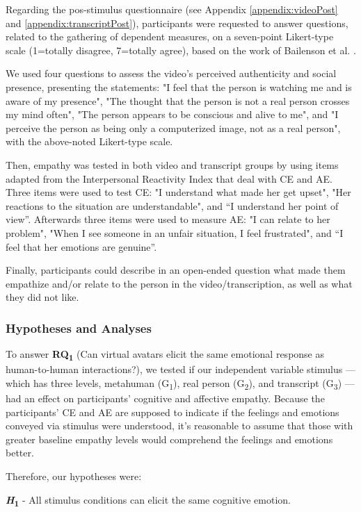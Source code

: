 Regarding the pos-stimulus questionnaire (see Appendix \ref{appendix:videoPost} and \ref{appendix:transcriptPost}), participants were requested to answer questions, related to the gathering of dependent measures, on a seven-point Likert-type scale (1=totally disagree, 7=totally agree), based on the work of Bailenson et al. \cite{BAI03}.

We used four questions to assess the video's perceived authenticity and social presence, presenting the statements: "I feel that the person is watching me and is aware of my presence", "The thought that the person is not a real person crosses my mind often", "The person appears to be conscious and alive to me", and "I perceive the person as being only a computerized image, not as a real person", with the above-noted Likert-type scale.

Then, empathy was tested in both video and transcript groups by using items adapted from the Interpersonal Reactivity Index \cite{DAV83} that deal with  CE and AE. Three items were used to test CE: "I understand what made her get upset", "Her reactions to the situation are understandable", and “I understand her point of view”. Afterwards three items were used to measure AE: "I can relate to her problem", "When I see someone in an unfair situation, I feel frustrated", and “I feel that her emotions are genuine”.

Finally, participants could describe in an open-ended question what made them empathize and/or relate to the person in the video/transcription, as well as what they did not like.

\subsubsection{Hypotheses and Analyses}
To answer \textbf{RQ\textsubscript{1}} (Can virtual avatars elicit the same emotional response as human-to-human interactions?), we tested if our independent variable stimulus --- which has three levels, metahuman (G\textsubscript{1}), real person (G\textsubscript{2}), and transcript (G\textsubscript{3}) --- had an effect on participants' cognitive and affective empathy. Because the participants' CE and AE are supposed to indicate if the feelings and emotions conveyed via stimulus were understood, it's reasonable to assume that those with greater baseline empathy levels would comprehend the feelings and emotions better.

Therefore, our hypotheses were:

\textbf{\textit{H}\textsubscript{1}} - All stimulus conditions can elicit the same cognitive emotion.

